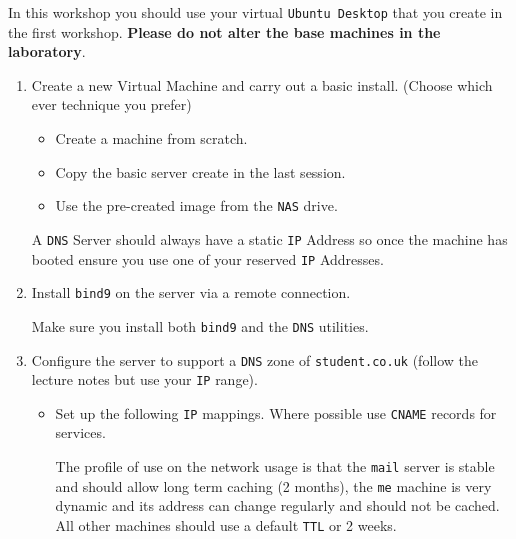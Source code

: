 \documentclass[11pt]{article}
\begin{document}

\begin{tcolorbox}[title={\textbf{NOTE:}}]
    In this workshop you should use your virtual \texttt{Ubuntu Desktop} that you create in the first workshop. \textbf{Please do not alter the base machines in the laboratory}.
\end{tcolorbox}

\begin{enumerate}
    \item Create a new Virtual Machine and carry out a basic install. (Choose which ever technique you prefer)
        \begin{itemize}
            \item Create a machine from scratch.
            \item Copy the basic server create in the last session.
            \item Use the pre-created image from the \texttt{NAS} drive.
        \end{itemize}
        \begin{tcolorbox}[title={\textbf{NOTE:}}]
            A \texttt{DNS} Server should always have a static \texttt{IP} Address so once the machine has booted ensure you use one of your reserved \texttt{IP} Addresses.
        \end{tcolorbox}
    \item Install \texttt{bind9} on the server via a remote connection. 
        \begin{tcolorbox}[title={\textbf{NOTE:}}]
            Make sure you install both \texttt{bind9} and the \texttt{DNS} utilities. 
        \end{tcolorbox}
    \item Configure the server to support a \texttt{DNS} zone of \texttt{student.co.uk} (follow the lecture notes but use your \texttt{IP} range).
        \begin{itemize}
            \item Set up the following \texttt{IP} mappings. Where possible use \texttt{CNAME} records for services.
                \begin{tcolorbox}[title={\textbf{NOTE:}}]
                    The profile of use on the network usage is that the \texttt{mail} server is stable and should allow long term caching (2 months), the \texttt{me} machine is very dynamic and its address can change regularly and should not be cached. All other machines should use a default \texttt{TTL} or 2 weeks.
                \end{tcolorbox}

\end{itemize}
\end{enumerate}
\end{document}
